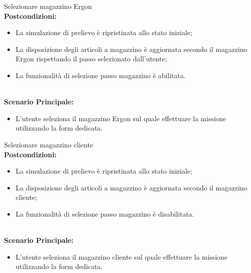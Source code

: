 \begin{usecase}{9}{Selezionare magazzino Ergon}
\textbf{\\Postcondizioni:}
\begin{itemize}
    \item La simulazione di prelievo è ripristinata allo stato iniziale;
    \item La disposizione degli articoli a magazzino è aggiornata secondo il magazzino Ergon rispettando il passo selezionato dall'utente;
    \item La funzionalità di selezione passo magazzino è abilitata.
\end{itemize}
\textbf{\\Scenario Principale:}
\begin{itemize}
    \item L'utente seleziona il magazzino Ergon sul quale effettuare la missione utilizzando la form dedicata.
\end{itemize}
\label{uc:scenario-principale}
\end{usecase}
\begin{usecase}{10}{Selezionare magazzino cliente}
\textbf{\\Postcondizioni:}
\begin{itemize}
    \item La simulazione di prelievo è ripristinata allo stato iniziale;
    \item La disposizione degli articoli a magazzino è aggiornata secondo il magazzino cliente;
    \item La funzionalità di selezione passo magazzino è disabilitata.
\end{itemize}
\textbf{\\Scenario Principale:}
\begin{itemize}
    \item L'utente seleziona il magazzino cliente sul quale effettuare la missione utilizzando la form dedicata.
\end{itemize}
\label{uc:scenario-principale}
\end{usecase}
